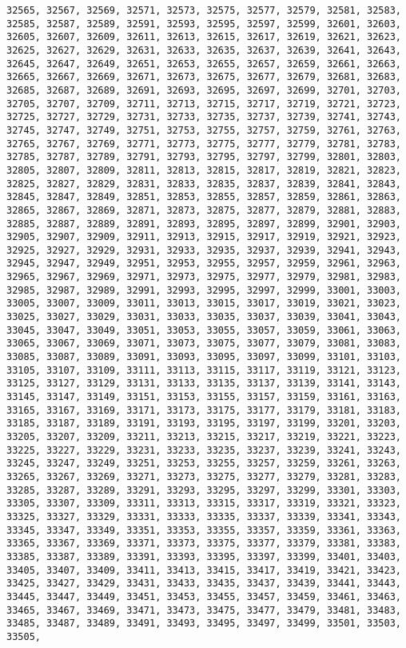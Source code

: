 \documentclass[11pt]{article}
\begin{document}
\begin{Verbatim}[commandchars=\\\{\}]
32565, 32567, 32569, 32571, 32573, 32575, 32577, 32579, 32581, 32583, 32585, 32587, 32589, 32591, 32593, 32595, 32597, 32599, 32601, 32603, 32605, 32607, 32609, 32611, 32613, 32615, 32617, 32619, 32621, 32623, 32625, 32627, 32629, 32631, 32633, 32635, 32637, 32639, 32641, 32643, 32645, 32647, 32649, 32651, 32653, 32655, 32657, 32659, 32661, 32663, 32665, 32667, 32669, 32671, 32673, 32675, 32677, 32679, 32681, 32683, 32685, 32687, 32689, 32691, 32693, 32695, 32697, 32699, 32701, 32703, 32705, 32707, 32709, 32711, 32713, 32715, 32717, 32719, 32721, 32723, 32725, 32727, 32729, 32731, 32733, 32735, 32737, 32739, 32741, 32743, 32745, 32747, 32749, 32751, 32753, 32755, 32757, 32759, 32761, 32763, 32765, 32767, 32769, 32771, 32773, 32775, 32777, 32779, 32781, 32783, 32785, 32787, 32789, 32791, 32793, 32795, 32797, 32799, 32801, 32803, 32805, 32807, 32809, 32811, 32813, 32815, 32817, 32819, 32821, 32823, 32825, 32827, 32829, 32831, 32833, 32835, 32837, 32839, 32841, 32843, 32845, 32847, 32849, 32851, 32853, 32855, 32857, 32859, 32861, 32863, 32865, 32867, 32869, 32871, 32873, 32875, 32877, 32879, 32881, 32883, 32885, 32887, 32889, 32891, 32893, 32895, 32897, 32899, 32901, 32903, 32905, 32907, 32909, 32911, 32913, 32915, 32917, 32919, 32921, 32923, 32925, 32927, 32929, 32931, 32933, 32935, 32937, 32939, 32941, 32943, 32945, 32947, 32949, 32951, 32953, 32955, 32957, 32959, 32961, 32963, 32965, 32967, 32969, 32971, 32973, 32975, 32977, 32979, 32981, 32983, 32985, 32987, 32989, 32991, 32993, 32995, 32997, 32999, 33001, 33003, 33005, 33007, 33009, 33011, 33013, 33015, 33017, 33019, 33021, 33023, 33025, 33027, 33029, 33031, 33033, 33035, 33037, 33039, 33041, 33043, 33045, 33047, 33049, 33051, 33053, 33055, 33057, 33059, 33061, 33063, 33065, 33067, 33069, 33071, 33073, 33075, 33077, 33079, 33081, 33083, 33085, 33087, 33089, 33091, 33093, 33095, 33097, 33099, 33101, 33103, 33105, 33107, 33109, 33111, 33113, 33115, 33117, 33119, 33121, 33123, 33125, 33127, 33129, 33131, 33133, 33135, 33137, 33139, 33141, 33143, 33145, 33147, 33149, 33151, 33153, 33155, 33157, 33159, 33161, 33163, 33165, 33167, 33169, 33171, 33173, 33175, 33177, 33179, 33181, 33183, 33185, 33187, 33189, 33191, 33193, 33195, 33197, 33199, 33201, 33203, 33205, 33207, 33209, 33211, 33213, 33215, 33217, 33219, 33221, 33223, 33225, 33227, 33229, 33231, 33233, 33235, 33237, 33239, 33241, 33243, 33245, 33247, 33249, 33251, 33253, 33255, 33257, 33259, 33261, 33263, 33265, 33267, 33269, 33271, 33273, 33275, 33277, 33279, 33281, 33283, 33285, 33287, 33289, 33291, 33293, 33295, 33297, 33299, 33301, 33303, 33305, 33307, 33309, 33311, 33313, 33315, 33317, 33319, 33321, 33323, 33325, 33327, 33329, 33331, 33333, 33335, 33337, 33339, 33341, 33343, 33345, 33347, 33349, 33351, 33353, 33355, 33357, 33359, 33361, 33363, 33365, 33367, 33369, 33371, 33373, 33375, 33377, 33379, 33381, 33383, 33385, 33387, 33389, 33391, 33393, 33395, 33397, 33399, 33401, 33403, 33405, 33407, 33409, 33411, 33413, 33415, 33417, 33419, 33421, 33423, 33425, 33427, 33429, 33431, 33433, 33435, 33437, 33439, 33441, 33443, 33445, 33447, 33449, 33451, 33453, 33455, 33457, 33459, 33461, 33463, 33465, 33467, 33469, 33471, 33473, 33475, 33477, 33479, 33481, 33483, 33485, 33487, 33489, 33491, 33493, 33495, 33497, 33499, 33501, 33503, 33505, 
\end{Verbatim}
\end{document}
